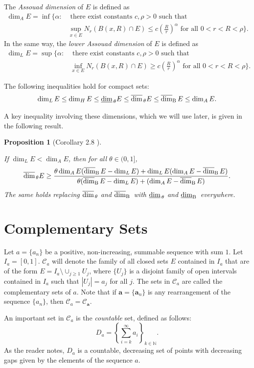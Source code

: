 \documentclass[11pt,reqno,bookmarksnumbered,raiselinks,breaklinks,colorlinks,plainpages]{amsart}
\newcommand\ubd{\overline{\mbox{\rm dim}}_{\rm B}\,} %
\newcommand\lbd{\underline{\mbox{\rm dim}}_{\rm B}\,} %
\newcommand\da{\underline{\mbox{\rm dim}}_{\,\theta}} %
\newcommand\uda{\overline{\mbox{\rm dim}}_{\,\theta}} %
\newtheorem{prop}[theo]{Proposition}
\begin{document}
The \emph{Assouad dimension} of $E$ is defined as 
\begin{align*}
    \dim_A E= \inf\{ \alpha : & \text{ there exist constants } c,\rho>0 \text{ such that }\\
    & \sup_{x \in E} N_r (B(x,R) \cap E) \leq c\left(\frac{R}{r}\right)^\alpha \text{ for all } 0<r<R<\rho \}.
\end{align*}
In the same way, the \emph{lower Assouad dimension} of $E$ is defined as
\begin{align*}
    \dim_L E= \sup\{ \alpha : & \text{ there exist constants } c,\rho>0 \text{ such that }\\
    & \inf_{x \in E} N_r (B(x,R) \cap E) \geq c\left(\frac{R}{r}\right)^\alpha \text{ for all } 0<r<R<\rho \}.
\end{align*}

The following inequalities hold for compact sets:
$$\dim_L E \leq \dim_H E \leq \da E\leq \uda E\leq \ubd E\leq \dim_A E.$$

A key inequality involving these dimensions, which we will use later, is given in the following result. 
\begin{prop} [Corollary 2.8 \cite{Banaji-R22}] \label{banajis bound}
  
If $\dim_L E<\dim_A E$, then for all $\theta \in (0,1]$,
\[
     \uda E \geq \frac{\theta\dim_A E (\ubd E - \dim_L E) + \dim_L E (\dim_A E - \ubd E)}{\theta(\ubd E - \dim_L E) + (\dim_A E-\ubd E)}.
\]
The same holds replacing $\uda$ and $\ubd$ with $\da$ and $\lbd$ everywhere.
\end{prop}


\section{Complementary Sets}\label{Comp sets}
Let $a=\{a_n\}$ be a positive, non-increasing, summable sequence with sum $1$. Let $I_a=[0,1]$. $\mathcal{C}_a$ will denote the family of all closed sets $E$ contained in $I_a$ that are of the form $E=I_a \setminus \displaystyle\cup_{j \geq 1} U_j$, where $\{U_j\}$ is a disjoint family of open intervals contained in $I_a$ such that $|U_j|=a_j$ for all $j$. The sets in $\mathcal{C}_a$ are called the complementary sets of $a$. Note that if $\mathbf{a}=\{\mathbf{a}_n\}$ is any rearrangement of the sequence $\{a_n\}$, then $\mathcal{C}_a=\mathcal{C}_{\mathbf{a}}$.

An important set in $\mathcal{C}_a$ is the \emph{countable} set, defined as follows:
$$D_a=\left\{\sum_{i=k}^{\infty} a_i\right\}_{k\in\mathbb{N}}.$$ 
As the reader notes, $D_a$ is a countable, decreasing set of points with decreasing gaps given by the elements of the sequence $a$.
\end{document}
